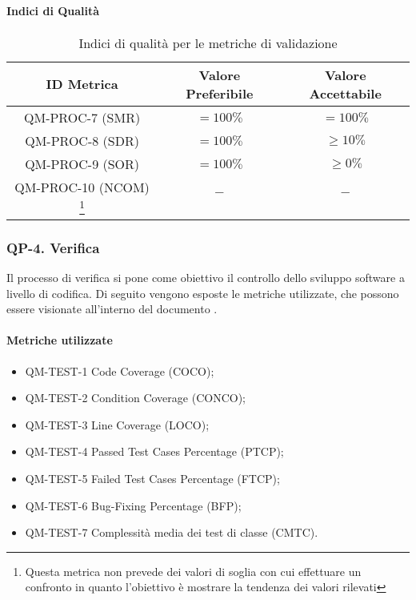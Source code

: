 		\paragraph{Indici di Qualità}

			\begin{center}
				\begin{longtable}{|c|c|c|}
				\hline
				\rowcolor{lighter-grayer}
				\textbf{ID Metrica} & \textbf{Valore Preferibile} & \textbf{Valore Accettabile}\\
				\hline
				\endfirsthead
				\hline
				QM-PROC-7 (SMR) & \(= 100\%\) & \(= 100\%\) \\
				\hline
				QM-PROC-8 (SDR) & \(= 100\%\) & \(\geq 10\%\) \\
				\hline
				QM-PROC-9 (SOR) & \(= 100\%\) & \(\geq 0\%\) \\
				\hline
				QM-PROC-10 (NCOM) \footnote{Questa metrica non prevede dei valori di soglia con cui effettuare un confronto in quanto l'obiettivo è mostrare la tendenza dei valori rilevati} & \(-\) & \(-\) \\
				\hline
				\caption{Indici di qualità per le metriche di validazione}
				\end{longtable}
			\end{center}
	\newpage
	\subsubsection{QP-4. Verifica}

		Il processo di verifica si pone come obiettivo il controllo dello sviluppo software a livello di codifica.
		\newline
		Di seguito vengono esposte le metriche utilizzate, che possono essere visionate all'interno del documento .

		\paragraph{Metriche utilizzate}

			\begin{itemize}
				\item QM-TEST-1 Code Coverage (COCO);
				\item QM-TEST-2 Condition Coverage (CONCO);
				\item QM-TEST-3 Line Coverage (LOCO);
				\item QM-TEST-4 Passed Test Cases Percentage (PTCP);
				\item QM-TEST-5 Failed Test Cases Percentage (FTCP);
				\item QM-TEST-6 Bug-Fixing Percentage (BFP);
				\item QM-TEST-7 Complessità media dei test di classe (CMTC).
			\end{itemize}


